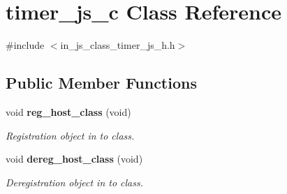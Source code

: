 \section{timer\+\_\+js\+\_\+c Class Reference}
\label{classtimer__js__c}


{\ttfamily \#include $<$in\+\_\+js\+\_\+class\+\_\+timer\+\_\+js\+\_\+h.\+h$>$}

\subsection*{Public Member Functions}
\begin{DoxyCompactItemize}
\item 
void \textbf{ reg\+\_\+host\+\_\+class} (void)
\begin{DoxyCompactList}\small\item\em Registration object in to class. \end{DoxyCompactList}\item 
void \textbf{ dereg\+\_\+host\+\_\+class} (void)
\begin{DoxyCompactList}\small\item\em Deregistration object in to class. \end{DoxyCompactList}\end{DoxyCompactItemize}
